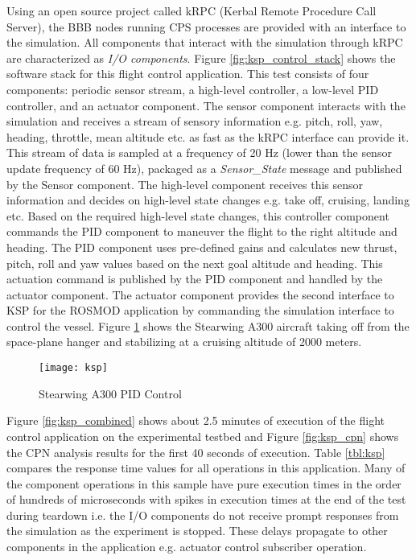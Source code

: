 Using an open source project called kRPC \cite{kRPC} (Kerbal Remote Procedure Call Server), the BBB nodes running CPS processes are provided with an interface to the simulation. All components that interact with the simulation through kRPC are characterized as \emph{I/O components}. Figure \ref{fig:ksp_control_stack} shows the software stack for this flight control application. This test consists of four components: periodic sensor stream, a high-level controller, a low-level PID controller, and an actuator component. The sensor component interacts with the simulation and receives a stream of sensory information e.g. pitch, roll, yaw, heading, throttle, mean altitude etc. as fast as the kRPC interface can provide it. This stream of data is sampled at a frequency of 20 Hz (lower than the sensor update frequency of 60 Hz), packaged as a \emph{Sensor\_State} message and published by the Sensor component. The high-level component receives this sensor information and decides on high-level state changes e.g. take off, cruising, landing etc. Based on the required high-level state changes, this controller component commands the PID component to maneuver the flight to the right altitude and heading. The PID component uses pre-defined gains and calculates new thrust, pitch, roll and yaw values based on the next goal altitude and heading. This actuation command is published by the PID component and handled by the actuator component. The actuator component provides the second interface to KSP for the ROSMOD application by commanding the simulation interface to control the vessel. Figure \ref{fig:ksp} shows the Stearwing A300 aircraft taking off from the space-plane hanger and stabilizing at a cruising altitude of 2000 meters. 

\begin{figure}[h]
	\centering
	\texttt{[image: ksp]}
	\caption{Stearwing A300 PID Control}
	\label{fig:ksp}
\end{figure} 
\FloatBarrier 

Figure \ref{fig:ksp_combined} shows about 2.5 minutes of execution of the flight control application on the experimental testbed and Figure \ref{fig:ksp_cpn} shows the CPN analysis results for the first 40 seconds of execution. Table \ref{tbl:ksp} compares the response time values for all operations in this application. Many of the component operations in this sample have pure execution times in the order of hundreds of microseconds with spikes in execution times at the end of the test during teardown i.e. the I/O components do not receive prompt responses from the simulation as the experiment is stopped. These delays propagate to other components in the application e.g. actuator control subscriber operation. 

